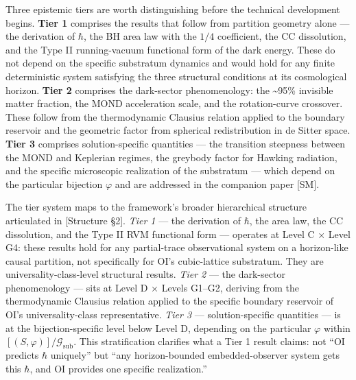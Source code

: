 \documentclass[
]{article}
\begin{document}
Three epistemic tiers are worth distinguishing before the technical
development begins. \textbf{Tier 1} comprises the results that follow
from partition geometry alone --- the derivation of \(\hbar\), the BH
area law with the \(1/4\) coefficient, the CC dissolution, and the Type
II running-vacuum functional form of the dark energy. These do not
depend on the specific substratum dynamics and would hold for any finite
deterministic system satisfying the three structural conditions at its
cosmological horizon. \textbf{Tier 2} comprises the dark-sector
phenomenology: the \textasciitilde95\% invisible matter fraction, the
MOND acceleration scale, and the rotation-curve crossover. These follow
from the thermodynamic Clausius relation applied to the boundary
reservoir and the geometric factor from spherical redistribution in de
Sitter space. \textbf{Tier 3} comprises solution-specific quantities ---
the transition steepness between the MOND and Keplerian regimes, the
greybody factor for Hawking radiation, and the specific microscopic
realization of the substratum --- which depend on the particular
bijection \(\varphi\) and are addressed in the companion paper {[}SM{]}.

The tier system maps to the framework's broader hierarchical structure
articulated in {[}Structure §2{]}. \emph{Tier 1} --- the derivation of
\(\hbar\), the area law, the CC dissolution, and the Type II RVM
functional form --- operates at Level C × Level G4: these results hold
for any partial-trace observational system on a horizon-like causal
partition, not specifically for OI's cubic-lattice substratum. They are
universality-class-level structural results. \emph{Tier 2} --- the
dark-sector phenomenology --- sits at Level D × Levels G1--G2, deriving
from the thermodynamic Clausius relation applied to the specific
boundary reservoir of OI's universality-class representative. \emph{Tier
3} --- solution-specific quantities --- is at the bijection-specific
level below Level D, depending on the particular \(\varphi\) within
\([(S, \varphi)]/\mathcal{G}_{\text{sub}}\). This stratification
clarifies what a Tier 1 result claims: not ``OI predicts \(\hbar\)
uniquely'' but ``any horizon-bounded embedded-observer system gets this
\(\hbar\), and OI provides one specific realization.''
\end{document}
